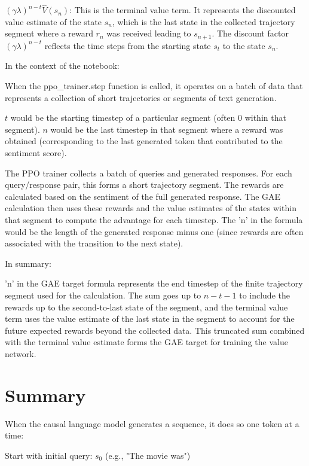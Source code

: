 \documentclass[10pt,a4paper]{report}
\begin{document}
    $(\gamma\lambda)^{n-t} \hat{V}(s_n)$: This is the terminal value term. It represents the discounted value estimate of the state $s_n$, which is the last state in the collected trajectory segment where a reward $r_n$ was received leading to $s_{n+1}$. The discount factor $(\gamma\lambda)^{n-t}$ reflects the time steps from the starting state $s_t$ to the state $s_n$.

In the context of the notebook:

When the ppo\_trainer.step function is called, it operates on a batch of data that represents a collection of short trajectories or segments of text generation.

    $t$ would be the starting timestep of a particular segment (often 0 within that segment).
    $n$ would be the last timestep in that segment where a reward was obtained (corresponding to the last generated token that contributed to the sentiment score).

The PPO trainer collects a batch of queries and generated responses. For each query/response pair, this forms a short trajectory segment. The rewards are calculated based on the sentiment of the full generated response. The GAE calculation then uses these rewards and the value estimates of the states within that segment to compute the advantage for each timestep. The 'n' in the formula would be the length of the generated response minus one (since rewards are often associated with the transition to the next state).

In summary:

'n' in the GAE target formula represents the end timestep of the finite trajectory segment used for the calculation. The sum goes up to $n-t-1$ to include the rewards up to the second-to-last state of the segment, and the terminal value term uses the value estimate of the last state in the segment to account for the future expected rewards beyond the collected data. This truncated sum combined with the terminal value estimate forms the GAE target for training the value network.

\section{Summary}
When the causal language model generates a sequence, it does so one token at a time:

Start with initial query: $s_0$ (e.g., "The movie was")
\end{document}
